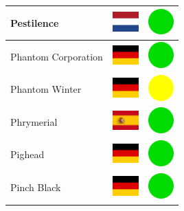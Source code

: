 \documentclass[12pt, a4paper, twoside]{report}
\begin{document}
\begin{center}
\begin{longtable}{|p{5cm}|p{2cm}|p{2cm}|}
 Pestilence                                                 & \includegraphics[width=1cm]{../4x3/nl} &   \includegraphics[width=1cm]{../likes/y} \\ \hline
 Phantom Corporation                                        & \includegraphics[width=1cm]{../4x3/de} &   \includegraphics[width=1cm]{../likes/y} \\ \hline
 Phantom Winter                                             & \includegraphics[width=1cm]{../4x3/de} &   \includegraphics[width=1cm]{../likes/m} \\ \hline
 Phrymerial                                                 & \includegraphics[width=1cm]{../4x3/es} &   \includegraphics[width=1cm]{../likes/y} \\ \hline
 Pighead                                                    & \includegraphics[width=1cm]{../4x3/de} &   \includegraphics[width=1cm]{../likes/y} \\ \hline
 Pinch Black                                                & \includegraphics[width=1cm]{../4x3/de} &   \includegraphics[width=1cm]{../likes/y} \\ \hline

\end{longtable}
\end{center}
\end{document}
